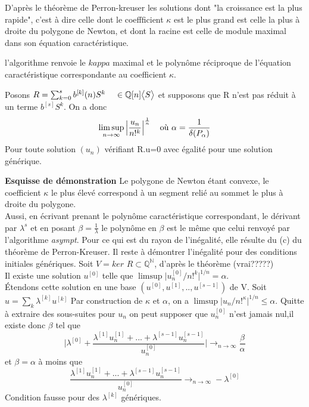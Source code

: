 \documentclass[a4paper,10.5pt]{article}
\begin{document}
	\noindent D'après le théorème de Perron-kreuser les solutions dont "la croissance est la plus rapide", c'est à dire celle dont le coeffficient $\kappa$ est le plus grand est celle la plus à droite du polygone de Newton, et dont la racine est celle de module maximal dans son équation caractéristique.
	
	l'algorithme renvoie le $kappa$ maximal et le polynôme réciproque de l'équation caractéristique correspondante au coefficient $\kappa$.
	
	\begin{proposition} Posons $R=\sum_{k=0}^{s} b^{[k]}(n)S^{k} \hspace{4mm} \in \mathbb{Q}[n]\big<S\big>$ et supposons que R n'est pas réduit à un terme $b^{[s]}S^{k}$. On a donc
		\[\limsup_{n \rightarrow \infty }\Big|\frac{u_{n}}{n!^{k}}\Big|^{\frac{1}{n}} \hspace{4mm} \text{où } \alpha=\frac{1}{\delta(P_{\alpha})}\]
		Pour toute solution $(u_{n})$ vérifiant R.u=0 avec égalité pour une solution générique. 
	\end{proposition}
	\textbf{Esquisse de démonstration}
	Le polygone de Newton étant convexe, le coefficient $\kappa$ le plus élevé correspond à un segment relié au sommet le plus à droite du polygone.\\
	Aussi, en écrivant prenant le polynôme caractéristique correspondant, le dérivant par $\lambda^{s}$ et en posant $\beta=\frac{1}{\lambda}$ le polynôme en $\beta$ est le même que celui renvoyé par l'algorithme \textit{asympt}. Pour ce qui est du rayon de l'inégalité, elle résulte du (c) du théorème de Perron-Kreuser.
	Il reste à démontrer l'inégalité pour des conditions initiales génériques. Soit $V=ker$ $R \subset \mathbb{Q}^{\mathbb{N}}$, d'après le théorème (vrai?????)\\
	Il existe une solution $u^{[0]}$ telle que $\limsup \big|u^{[0]}_{n}/n!^{k}\big|^{1/n}=\alpha$.\\
	Étendons cette solution en une base $(u^{[0]},u^{[1]},..,u^{[s-1]})$ de V. Soit $u=\sum_{k}\lambda^{[k]}u^{[k]}$
	Par construction de $\kappa$ et $\alpha$, on a $\limsup \big|u_{n}/n!^{\kappa}\big|^{1/n} \leq \alpha$. Quitte à extraire des sous-suites pour $u_{n}$ on peut supposer que $u^{[0]}_{n}$ n'est jamais nul,il existe donc $\beta$ tel que
	\[\Big|\lambda^{[0]}+\frac{\lambda^{[1]}u^{[1]}_{n}+...+\lambda^{[s-1]}u^{[s-1]}_{n}}{u^{[0]}_{n}}\Big| \rightarrow_{n \rightarrow \infty} \frac{\beta}{\alpha}\] 
	et $\beta=\alpha$ à moins que 
	\[\frac{\lambda^{[1]}u^{[1]}_{n}+...+\lambda^{[s-1]}u^{[s-1]}_{n}}{u^{[0]}_{n}}\rightarrow_{n \rightarrow \infty}-\lambda^{[0]}\]
	Condition fausse pour des $\lambda^{[k]}$ génériques.
	
\end{document}

